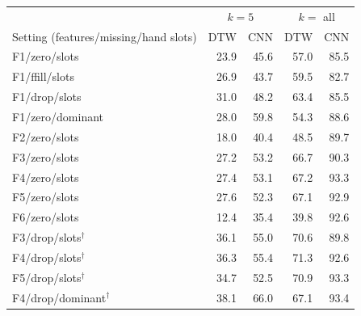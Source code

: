 \begin{tabular}{lrrrr}
\toprule
 & \multicolumn{2}{c}{$k=5$} & \multicolumn{2}{c}{$k=$ all} \\
Setting (features/missing/hand slots) & DTW & CNN & DTW & CNN \\
\midrule
F1/zero/slots & 23.9 & 45.6 & 57.0 & 85.5 \\
F1/ffill/slots & 26.9 & 43.7 & 59.5 & 82.7 \\
F1/drop/slots & 31.0 & 48.2 & 63.4 & 85.5 \\
F1/zero/dominant & 28.0 & 59.8 & 54.3 & 88.6 \\
F2/zero/slots & 18.0 & 40.4 & 48.5 & 89.7 \\
F3/zero/slots & 27.2 & 53.2 & 66.7 & 90.3 \\
F4/zero/slots & 27.4 & 53.1 & 67.2 & 93.3 \\
F5/zero/slots & 27.6 & 52.3 & 67.1 & 92.9 \\
F6/zero/slots & 12.4 & 35.4 & 39.8 & 92.6 \\
F3/drop/slots$^\dagger$ & 36.1 & 55.0 & 70.6 & 89.8 \\
F4/drop/slots$^\dagger$ & 36.3 & 55.4 & 71.3 & 92.6 \\
F5/drop/slots$^\dagger$ & 34.7 & 52.5 & 70.9 & 93.3 \\
F4/drop/dominant$^\dagger$ & 38.1 & 66.0 & 67.1 & 93.4 \\
\bottomrule
\end{tabular}
